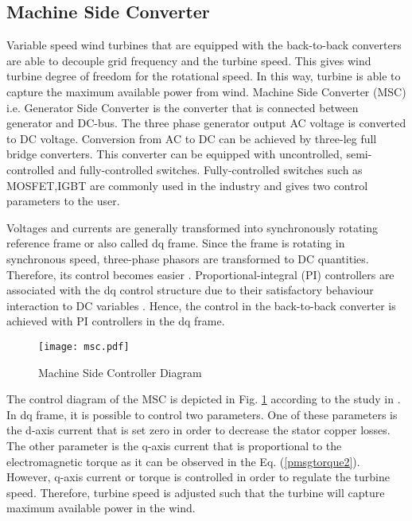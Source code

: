 \subsection{Machine Side Converter}
Variable speed wind turbines that are equipped with the back-to-back converters are able to decouple grid frequency and the turbine speed. This gives wind turbine degree of freedom for the rotational speed. In this way, turbine is able to capture the maximum available power from wind. Machine Side Converter (MSC) i.e. Generator Side Converter is the converter that is connected between generator and DC-bus. The three phase generator output AC voltage is converted to DC voltage. Conversion from AC to DC can be achieved by three-leg full bridge converters. This converter can be equipped with uncontrolled, semi-controlled and fully-controlled switches. Fully-controlled switches such as MOSFET,IGBT are commonly used in the industry and gives two control parameters to the user. \par
Voltages and currents are generally transformed into synchronously rotating reference frame or also called dq frame. Since the frame is rotating in synchronous speed, three-phase phasors are transformed to DC quantities. Therefore, its control becomes easier \cite{Kazmierkowski2002}. Proportional-integral (PI) controllers are associated with the dq control structure due to their satisfactory behaviour interaction to DC variables \cite{Blaabjerg2006a}. Hence, the control in the back-to-back converter is achieved with PI controllers in the dq frame. \par
\begin{figure}[h!]
	\centering
	\texttt{[image: msc.pdf]}
	\caption{Machine Side Controller Diagram}
	\label{msc}
\end{figure}
The control diagram of the MSC is depicted in Fig. \ref{msc} according to the study in \cite{Chinchilla2006}. In dq frame, it is possible to control two parameters. One of these parameters is the d-axis current that is set zero in order to decrease the stator copper losses. The other parameter is the q-axis current that is proportional to the electromagnetic torque as it can be observed in the Eq. (\ref{pmsgtorque2}). However, q-axis current or torque is controlled in order to regulate the turbine speed. Therefore, turbine speed is adjusted such that the turbine will capture maximum available power in the wind. 
